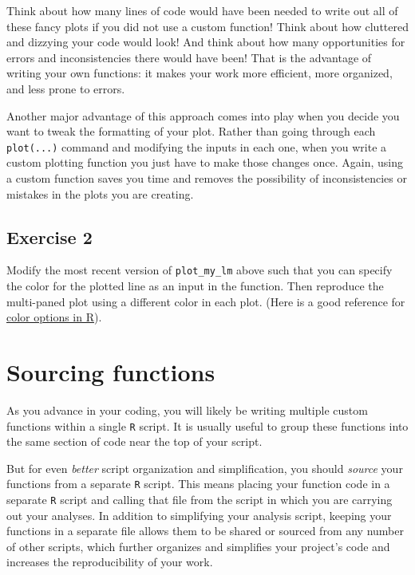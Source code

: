 \documentclass[
]{book}
\begin{document}
Think about how many lines of code would have been needed to write out all of these fancy plots if you did not use a custom function! Think about how cluttered and dizzying your code would look! And think about how many opportunities for errors and inconsistencies there would have been! That is the advantage of writing your own functions: it makes your work more efficient, more organized, and less prone to errors.

Another major advantage of this approach comes into play when you decide you want to tweak the formatting of your plot. Rather than going through each \texttt{plot(...)} command and modifying the inputs in each one, when you write a custom plotting function you just have to make those changes once. Again, using a custom function saves you time and removes the possibility of inconsistencies or mistakes in the plots you are creating.

\hypertarget{exercise-2-5}{%
\subsection*{Exercise 2}\label{exercise-2-5}}

Modify the most recent version of \texttt{plot\_my\_lm} above such that you can specify the color for the plotted line as an input in the function. Then reproduce the multi-paned plot using a different color in each plot. (Here is a good reference for \href{http://www.stat.columbia.edu/~tzheng/files/Rcolor.pdf}{color options in R}).

\hypertarget{sourcing-functions}{%
\section*{Sourcing functions}\label{sourcing-functions}}

As you advance in your coding, you will likely be writing multiple custom functions within a single \texttt{R} script. It is usually useful to group these functions into the same section of code near the top of your script.

But for even \emph{better} script organization and simplification, you should \emph{source} your functions from a separate \texttt{R} script. This means placing your function code in a separate \texttt{R} script and calling that file from the script in which you are carrying out your analyses. In addition to simplifying your analysis script, keeping your functions in a separate file allows them to be shared or sourced from any number of other scripts, which further organizes and simplifies your project's code and increases the reproducibility of your work.
\end{document}

